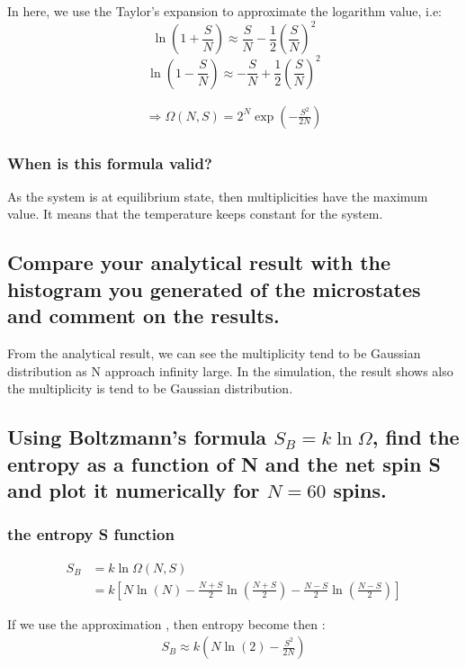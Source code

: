 \documentclass[a4paper,11pt]{article}
\begin{document}
In here, we use the Taylor's expansion to approximate the logarithm value, i.e:
$$
\ln(1+ \frac{S}{N})
\approx  \frac{S}{N}- \frac{1}{2}(\frac{S}{N})^2
$$
$$
\ln(1- \frac{S}{N})
\approx  -\frac{S}{N} +  \frac{1}{2}(\frac{S}{N})^2
$$

 
\begin{align*}
\Rightarrow
\Omega (N,S) = 2^N \exp( - \frac{S^2}{2N})
\end{align*}



\subsubsection{When is this formula valid?}

As the system is at equilibrium state, then  multiplicities have the maximum value.  It means that the temperature keeps constant for the system.


\subsection[2.6]{Compare your analytical result with the histogram you generated of the microstates and comment on the results.}

From the analytical result, we can see the multiplicity tend to be Gaussian distribution as N approach infinity large. In the simulation, the result shows also the multiplicity is tend to be Gaussian distribution. 

\subsection[2.7]{Using Boltzmann's formula $S_B = k \ln \Omega$, find the entropy as a function of N and the net spin S and plot it numerically for $N = 60$ spins.}

\subsubsection{the entropy S function}
\begin{align*}
S_B
&  = k\ln \Omega(N, S)
\\  
& = k[N\ln(N) -\frac{N + S}{2}\ln(\frac{N + S}{2}) -\frac{N - S}{2}\ln(\frac{N - S}{2}) ]
\end{align*}


If we use the approximation , then entropy become then :
\begin{align*}
S_B
\approx k( N\ln(2) - \frac{S^2}{2N})
\end{align*}
\end{document}
